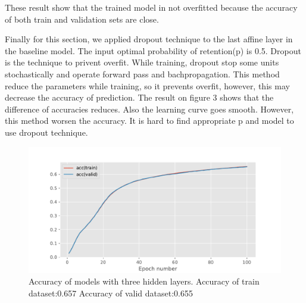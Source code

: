 \documentclass{article}
\begin{document}
These result show that the trained model in not overfitted because the accuracy of both train and validation sets are close.

Finally for this section, we applied dropout technique to the last affine layer in the baseline model. The input optimal probability of retention(p) is 0.5.
Dropout is the technique to privent overfit. While training, dropout stop some units stochastically and operate forward pass and bachpropagation. This method reduce the parameters while training, so it prevents overfit, however, this may decrease the accuracy of prediction.
The result on figure 3 shows that the difference of accuracies reduces. Also the learning curve goes smooth. However, this method worsen the accuracy. It is hard to find appropriate p and model to use dropout technique.

\begin{figure}[h]
\vskip 5mm
\begin{center}
\centerline{\includegraphics[width=\columnwidth]{c.pdf}}
\caption{Accuracy of models with three hidden layers.
Accuracy of train dataset:0.657
Accuracy of valid dataset:0.655
}

\end{center}
\vskip -5mm
\end{figure}
\end{document}
